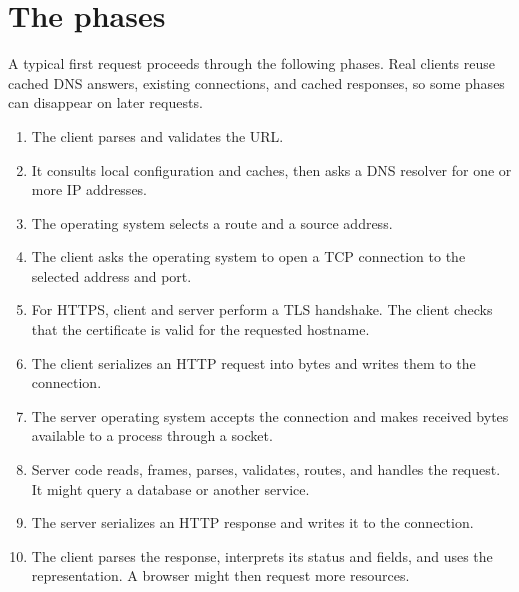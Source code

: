 \section{The phases}

A typical first request proceeds through the following phases. Real clients
reuse cached DNS answers, existing connections, and cached responses, so some
phases can disappear on later requests.

\begin{enumerate}
  \item The client parses and validates the URL.
  \item It consults local configuration and caches, then asks a DNS resolver for
        one or more IP addresses.
  \item The operating system selects a route and a source address.
  \item The client asks the operating system to open a TCP connection to the
        selected address and port.
  \item For HTTPS, client and server perform a TLS handshake. The client checks
        that the certificate is valid for the requested hostname.
  \item The client serializes an HTTP request into bytes and writes them to the
        connection.
  \item The server operating system accepts the connection and makes received
        bytes available to a process through a socket.
  \item Server code reads, frames, parses, validates, routes, and handles the
        request. It might query a database or another service.
  \item The server serializes an HTTP response and writes it to the connection.
  \item The client parses the response, interprets its status and fields, and
        uses the representation. A browser might then request more resources.
\end{enumerate}

